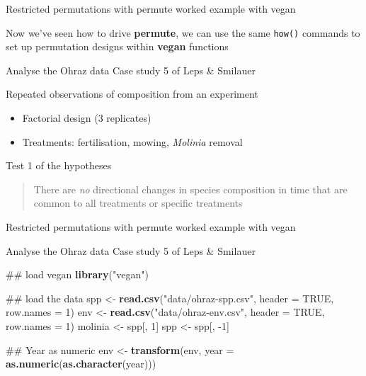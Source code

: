 \documentclass[10pt,ignorenonframetext,compress, aspectratio=169]{beamer}
\newenvironment{Shaded}{\begin{snugshade}}{\end{snugshade}}
\newcommand{\KeywordTok}[1]{\textcolor[rgb]{0.13,0.29,0.53}{\textbf{{#1}}}}
\newcommand{\DataTypeTok}[1]{\textcolor[rgb]{0.13,0.29,0.53}{{#1}}}
\newcommand{\DecValTok}[1]{\textcolor[rgb]{0.00,0.00,0.81}{{#1}}}
\newcommand{\StringTok}[1]{\textcolor[rgb]{0.31,0.60,0.02}{{#1}}}
\newcommand{\OtherTok}[1]{\textcolor[rgb]{0.56,0.35,0.01}{{#1}}}
\newcommand{\NormalTok}[1]{{#1}}
\providecommand{\tightlist}{%
  \setlength{\itemsep}{0pt}\setlength{\parskip}{0pt}}
\begin{document}
\begin{frame}[fragile]{Restricted permutations with permute \textbar{}
worked example with vegan}

Now we've seen how to drive \textbf{permute}, we can use the same
\texttt{how()} commands to set up permutation designs within
\textbf{vegan} functions

Analyse the Ohraz data Case study 5 of Leps \& Smilauer

Repeated observations of composition from an experiment

\begin{itemize}
\tightlist
\item
  Factorial design (3 replicates)
\item
  Treatments: fertilisation, mowing, \emph{Molinia} removal
\end{itemize}

Test 1 of the hypotheses

\begin{quote}
There are \emph{no} directional changes in species composition in time
that are common to all treatments or specific treatments
\end{quote}

\end{frame}

\begin{frame}[fragile]{Restricted permutations with permute \textbar{}
worked example with vegan}

Analyse the Ohraz data Case study 5 of Leps \& Smilauer

\scriptsize

\begin{Shaded}
\begin{Highlighting}[]
\NormalTok{## load vegan}
\KeywordTok{library}\NormalTok{(}\StringTok{"vegan"}\NormalTok{)}

\NormalTok{## load the data}
\NormalTok{spp <-}\StringTok{ }\KeywordTok{read.csv}\NormalTok{(}\StringTok{"data/ohraz-spp.csv"}\NormalTok{, }\DataTypeTok{header =} \OtherTok{TRUE}\NormalTok{, }\DataTypeTok{row.names =} \DecValTok{1}\NormalTok{)}
\NormalTok{env <-}\StringTok{ }\KeywordTok{read.csv}\NormalTok{(}\StringTok{"data/ohraz-env.csv"}\NormalTok{, }\DataTypeTok{header =} \OtherTok{TRUE}\NormalTok{, }\DataTypeTok{row.names =} \DecValTok{1}\NormalTok{)}
\NormalTok{molinia <-}\StringTok{ }\NormalTok{spp[, }\DecValTok{1}\NormalTok{]}
\NormalTok{spp <-}\StringTok{ }\NormalTok{spp[, -}\DecValTok{1}\NormalTok{]}

\NormalTok{## Year as numeric}
\NormalTok{env <-}\StringTok{ }\KeywordTok{transform}\NormalTok{(env, }\DataTypeTok{year =} \KeywordTok{as.numeric}\NormalTok{(}\KeywordTok{as.character}\NormalTok{(year)))}
\end{Highlighting}
\end{Shaded}

\normalsize

\end{frame}
\end{document}
